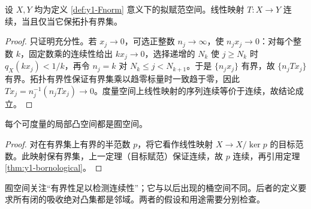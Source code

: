 \begin{theorem}[拟赋范空间上保有界集的线性映射]
设 $X,Y$ 均为定义 \ref{def:y1-Fnorm} 意义下的拟赋范空间。线性映射 $T:X\to Y$ 连续，当且仅当它保拓扑有界集。
\end{theorem}
\begin{proof}
只证明充分性。若 $x_j\to0$，可选正整数 $n_j\to\infty$，使 $n_jx_j\to0$：对每个整数 $k$，固定数乘的连续性给出 $kx_j\to0$，选择递增的 $N_k$ 使 $j\ge N_k$ 时 $q_X(kx_j)<1/k$，再令 $n_j=k$ 对 $N_k\le j<N_{k+1}$。于是 $\{n_jx_j\}$ 有界，故 $\{n_jTx_j\}$ 有界。拓扑有界性保证有界集乘以趋零标量时一致趋于零，因此 $Tx_j=n_j^{-1}(n_jTx_j)\to0$。度量空间上线性映射的序列连续等价于连续，故结论成立。
\end{proof}
\begin{corollary}[补充：可度量局部凸空间是囿空间]
每个可度量的局部凸空间都是囿空间。
\end{corollary}
\begin{proof}
对在有界集上有界的半范数 $p$，将它看作线性映射 $X\to X/\ker p$ 的目标范数。此映射保有界集，上一定理（目标赋范）保证连续，故 $p$ 连续，再引用定理 \ref{thm:y1-bornological}。
\end{proof}
囿空间关注“有界性足以检测连续性”；它与以后出现的桶空间不同。后者的定义要求所有闭的吸收绝对凸集都是邻域。两者的假设和用途需要分别检查。
